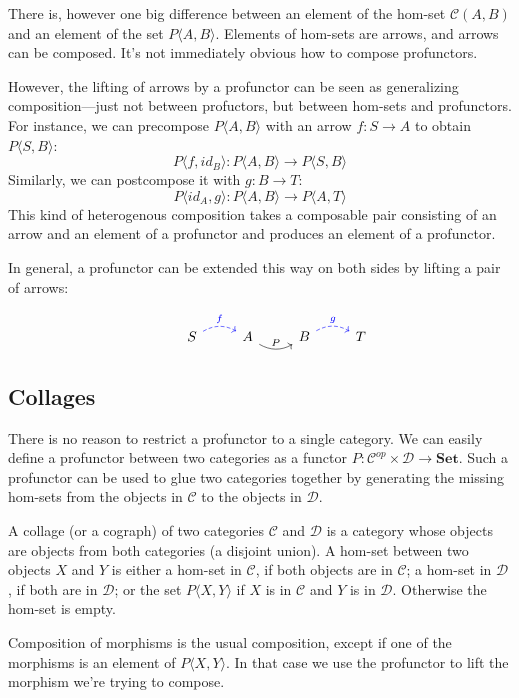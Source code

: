 \documentclass[DaoFP]{subfiles}
\begin{document}
There is, however one big difference between an element of the hom-set $ \mathcal{C}(A, B)$ and an element of the set $P\langle A, B \rangle$. Elements of hom-sets are arrows, and arrows can be composed. It's not immediately obvious how to compose profunctors. 

However, the lifting of arrows by a profunctor can be seen as generalizing composition---just not between profuctors, but between hom-sets and profunctors. For instance, we can precompose $P \langle A, B \rangle$ with an arrow $f \colon S \to A$ to obtain $P \langle S, B \rangle$:
\[ P\langle f, id_B \rangle \colon P \langle A, B \rangle \to P \langle S, B \rangle \]
Similarly, we can postcompose it with $g \colon B \to T$:
\[ P \langle id_A, g \rangle \colon P \langle A, B \rangle \to P \langle A, T \rangle \]
This kind of heterogenous composition takes a composable pair consisting of an arrow and an element of a profunctor and produces an element of a profunctor.

In general, a profunctor can be extended this way on both sides by lifting a pair of arrows:

\[
 \begin{tikzcd}
  & S
  \arrow[r, bend left, dashed, blue, "f"]
 & A
 \arrow[r, bend right, "P"]
 & B
  \arrow[r, bend left, dashed, blue, "g"]
 &  T
  \end{tikzcd}
\]

\subsection{Collages}

There is no reason to restrict a profunctor to a single category. We can easily define a profunctor between two categories as a functor $ P \colon \mathcal{C}^{op} \times  \mathcal{D} \to \mathbf{Set}$. Such a profunctor can be used to glue two categories together by generating the missing hom-sets from the objects in $\mathcal{C}$ to the objects in $\mathcal{D}$. 

A collage (or a cograph) of two categories $\mathcal{C}$ and $\mathcal{D}$ is a category whose objects are objects from both categories (a disjoint union). A hom-set between two objects $X$ and $Y$ is either a hom-set in $\mathcal{C}$, if both objects are in $\mathcal{C}$; a hom-set in $\mathcal{D}$, if both are in $\mathcal{D}$; or the set $P \langle X, Y\rangle$ if $X$ is in $\mathcal{C}$ and $Y$ is in $\mathcal{D}$. Otherwise the hom-set is empty. 

Composition of morphisms is the usual composition, except if one of the morphisms is an element of $P \langle X, Y \rangle$. In that case we use the profunctor to lift the morphism we're trying to compose. 
\end{document}
